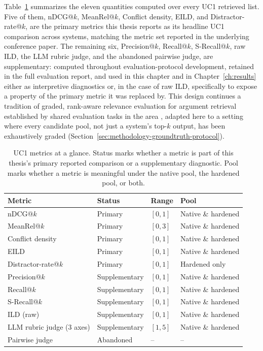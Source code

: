 Table~\ref{tab:uc1-metrics} summarizes the eleven quantities computed over every UC1 retrieved
list. Five of them, nDCG@$k$, MeanRel@$k$, Conflict density, EILD, and Distractor-rate@$k$, are
the primary metrics this thesis reports as its headline UC1 comparison across systems, matching
the metric set reported in the underlying conference paper. The remaining six, Precision@$k$,
Recall@$k$, S-Recall@$k$, raw ILD, the LLM rubric judge, and the abandoned pairwise judge, are
supplementary: computed throughout evaluation-protocol development, retained in the full evaluation
report, and used in this chapter and in Chapter~\ref{ch:results} either as interpretive diagnostics
or, in the case of raw ILD, specifically to expose a property of the primary metric it was replaced
by. This design continues a tradition of graded, rank-aware relevance evaluation for argument
retrieval established by shared evaluation tasks in the area \cite{touche2022,perspectivearg2024},
adapted here to a setting where every candidate pool, not just a system's top-$k$ output, has been
exhaustively graded (Section~\ref{sec:methodology-groundtruth-protocol}).

\begin{table}[htbp]
\centering
\caption{UC1 metrics at a glance. Status marks whether a metric is part of this thesis's primary
reported comparison or a supplementary diagnostic. Pool marks whether a metric is meaningful under
the native pool, the hardened pool, or both.}
\label{tab:uc1-metrics}
\begin{tabular}{llll}
\toprule
\textbf{Metric} & \textbf{Status} & \textbf{Range} & \textbf{Pool} \\
\midrule
nDCG@$k$ & Primary & $[0,1]$ & Native \& hardened \\
MeanRel@$k$ & Primary & $[0,3]$ & Native \& hardened \\
Conflict density & Primary & $[0,1]$ & Native \& hardened \\
EILD & Primary & $[0,1]$ & Native \& hardened \\
Distractor-rate@$k$ & Primary & $[0,1]$ & Hardened only \\
Precision@$k$ & Supplementary & $[0,1]$ & Native \& hardened \\
Recall@$k$ & Supplementary & $[0,1]$ & Native \& hardened \\
S-Recall@$k$ & Supplementary & $[0,1]$ & Native \& hardened \\
ILD (raw) & Supplementary & $[0,1]$ & Native \& hardened \\
LLM rubric judge (3 axes) & Supplementary & $[1,5]$ & Native \& hardened \\
Pairwise judge & Abandoned & -- & -- \\
\bottomrule
\end{tabular}
\end{table}

